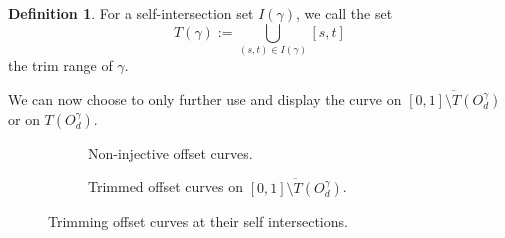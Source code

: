 \documentclass[a4paper, 11pt]{report}
\theoremstyle{definition}
\newtheorem{definition}{Definition}[section]
\begin{document}
	\begin{definition}
		For a self-intersection set $I(\gamma)$, we call the set
			$$T(\gamma) := \bigcup_{(s,t) \in I(\gamma)} [s,t]$$
		the trim range of $\gamma$.
	\end{definition}

	We can now choose to only further use and display the curve on $\overline{[0,1] \setminus T(O^\gamma_d)}$ or on $T(O^\gamma_d)$.

	\begin{figure}[H]
		\centering
		\begin{subfigure}{0.49\textwidth}
			
			\caption{Non-injective offset curves.}
		\end{subfigure}
		\begin{subfigure}{0.49\textwidth}
			
			\caption{Trimmed offset curves on $\overline{[0,1] \setminus T(O^\gamma_d)}$.}
		\end{subfigure}
		\caption{Trimming offset curves at their self intersections.}
		\label{fig:trimoffset}
	\end{figure}
\end{document}
